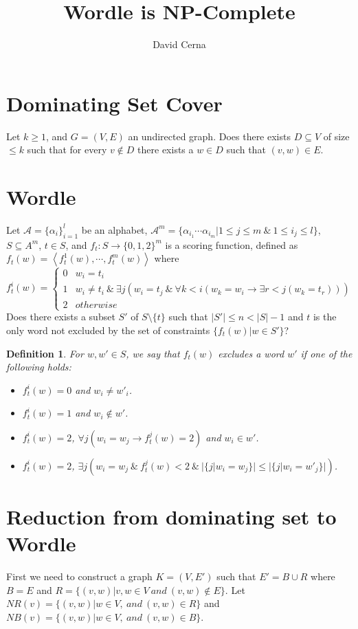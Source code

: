 \documentclass[10pt,a4paper]{article}
\author{David Cerna}
\title{Wordle is NP-Complete}
\newtheorem{definition}{Definition}
\begin{document}
\maketitle
\section{Dominating Set Cover}
Let $k\geq 1$,  and $G = (V, E)$ an undirected graph. Does there exists $D\subseteq V$ of size $\leq k$ such that for every $v\not \in D$ there exists a $w\in D$ such that $(v,w)\in E$.

\section{Wordle}
Let $\mathcal{A}= \{\alpha_{i}\}^{l}_{i=1}$ be an alphabet, $\mathcal{A}^{m} =\{ \alpha_{i_1}\cdots \alpha_{i_m}\vert 1\leq j\leq m\ \& \ 1\leq i_j\leq l\}$,  $S\subseteq A^m$, $t\in S$, and  $f_t:S\rightarrow \{0,1,2\}^m$ is a scoring function, defined as $f_t(w) = \left\langle f_t^1(w),\cdots, f_t^{m}(w)\right\rangle$ where
$$f_t^i(w) =\left\lbrace \begin{array}{cc}
0 &  w_i = t_i \\
1 & w_i \not = t_i\ \&\ \exists j(w_i = t_j \ \& \ \forall k< i(w_k =w_i \rightarrow \exists r< j (w_k=t_r)))\\
2 & otherwise
\end{array}\right.$$
Does there exists a subset $S'$ of $S\setminus \{t\}$ such that $\vert S'\vert \leq n< \vert S\vert-1 $ and $t$ is the only word not excluded by the set of constraints $\{f_t(w)\vert w\in S'\}$?

\begin{definition}
For $w,w'\in S$, we say that $f_t(w)$ excludes a word $w'$ if one of the following holds: 

\begin{itemize}
\item $f_t^i(w) = 0$ and $w_i\not= w'_i $. 
\item $f_t^i(w) = 1$ and $w_i \not \in w'$.
\item $f_t^i(w) = 2$, $\forall j( w_i = w_j\rightarrow f_t^j(w) = 2)$ and $w_i\in w'$.
\item $f_t^i(w) = 2$,  $\exists j( w_i = w_j \ \&\ f_t^j(w) < 2 \ \& \ \vert\{j\vert w_i=w_j\}\vert\leq \vert\{j\vert w_i=w'_j\}\vert)$.
\end{itemize}
\end{definition}

\section{Reduction from dominating set to Wordle}
First we need to construct a graph $K = (V,E')$ such that $E' =B\cup R$ where $B=E$ and $R =\{ (v,w)\vert v,w\in V \ and \ (v,w)\not \in E\}$. Let $\mathit{NR}(v) =\{ (v,w)\vert w\in V,\ and \ (v,w)\in R\}$ and
$\mathit{NB}(v) =\{ (v,w)\vert w\in V,\ and \ (v,w)\in B\}$.
\end{document}
